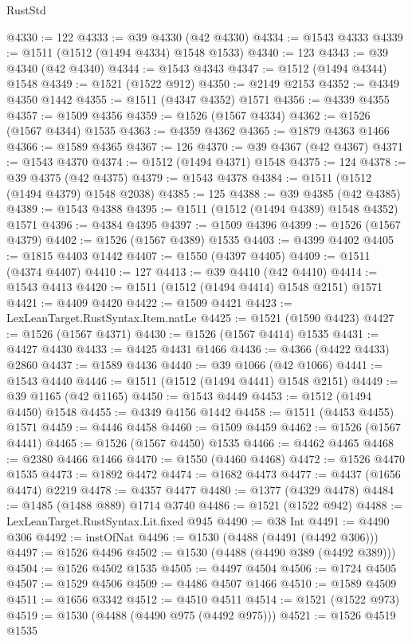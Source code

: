 \begin{lexlean}{RustStd}
\begin{coremodule}
{{@4330 := 122
@4333 := @39 @4330 (@42 @4330)
@4334 := @1543 @4333
@4339 := @1511 (@1512 (@1494 @4334) @1548 @1533)
@4340 := 123
@4343 := @39 @4340 (@42 @4340)
@4344 := @1543 @4343
@4347 := @1512 (@1494 @4344) @1548
@4349 := @1521 (@1522 @912)
@4350 := @2149 @2153
@4352 := @4349 @4350 @1442
@4355 := @1511 (@4347 @4352) @1571
@4356 := @4339 @4355
@4357 := @1509 @4356
@4359 := @1526 (@1567 @4334)
@4362 := @1526 (@1567 @4344) @1535
@4363 := @4359 @4362
@4365 := @1879 @4363 @1466
@4366 := @1589 @4365
@4367 := 126
@4370 := @39 @4367 (@42 @4367)
@4371 := @1543 @4370
@4374 := @1512 (@1494 @4371) @1548
@4375 := 124
@4378 := @39 @4375 (@42 @4375)
@4379 := @1543 @4378
@4384 := @1511 (@1512 (@1494 @4379) @1548 @2038)
@4385 := 125
@4388 := @39 @4385 (@42 @4385)
@4389 := @1543 @4388
@4395 := @1511 (@1512 (@1494 @4389) @1548 @4352) @1571
@4396 := @4384 @4395
@4397 := @1509 @4396
@4399 := @1526 (@1567 @4379)
@4402 := @1526 (@1567 @4389) @1535
@4403 := @4399 @4402
@4405 := @1815 @4403 @1442
@4407 := @1550 (@4397 @4405)
@4409 := @1511 (@4374 @4407)
@4410 := 127
@4413 := @39 @4410 (@42 @4410)
@4414 := @1543 @4413
@4420 := @1511 (@1512 (@1494 @4414) @1548 @2151) @1571
@4421 := @4409 @4420
@4422 := @1509 @4421
@4423 := LexLeanTarget.RustSyntax.Item.natLe
@4425 := @1521 (@1590 @4423)
@4427 := @1526 (@1567 @4371)
@4430 := @1526 (@1567 @4414) @1535
@4431 := @4427 @4430
@4433 := @4425 @4431 @1466
@4436 := @4366 (@4422 @4433) @2860
@4437 := @1589 @4436
@4440 := @39 @1066 (@42 @1066)
@4441 := @1543 @4440
@4446 := @1511 (@1512 (@1494 @4441) @1548 @2151)
@4449 := @39 @1165 (@42 @1165)
@4450 := @1543 @4449
@4453 := @1512 (@1494 @4450) @1548
@4455 := @4349 @4156 @1442
@4458 := @1511 (@4453 @4455) @1571
@4459 := @4446 @4458
@4460 := @1509 @4459
@4462 := @1526 (@1567 @4441)
@4465 := @1526 (@1567 @4450) @1535
@4466 := @4462 @4465
@4468 := @2380 @4466 @1466
@4470 := @1550 (@4460 @4468)
@4472 := @1526 @4470 @1535
@4473 := @1892 @4472
@4474 := @1682 @4473
@4477 := @4437 (@1656 @4474) @2219
@4478 := @4357 @4477
@4480 := @1377 (@4329 @4478)
@4484 := @1485 (@1488 @889) @1714 @3740
@4486 := @1521 (@1522 @942)
@4488 := LexLeanTarget.RustSyntax.Lit.fixed @945
@4490 := @38 Int
@4491 := @4490 @306
@4492 := instOfNat
@4496 := @1530 (@4488 (@4491 (@4492 @306)))
@4497 := @1526 @4496
@4502 := @1530 (@4488 (@4490 @389 (@4492 @389)))
@4504 := @1526 @4502 @1535
@4505 := @4497 @4504
@4506 := @1724 @4505
@4507 := @1529 @4506
@4509 := @4486 @4507 @1466
@4510 := @1589 @4509
@4511 := @1656 @3342
@4512 := @4510 @4511
@4514 := @1521 (@1522 @973)
@4519 := @1530 (@4488 (@4490 @975 (@4492 @975)))
@4521 := @1526 @4519 @1535
}}
\end{coremodule}
\end{lexlean}
